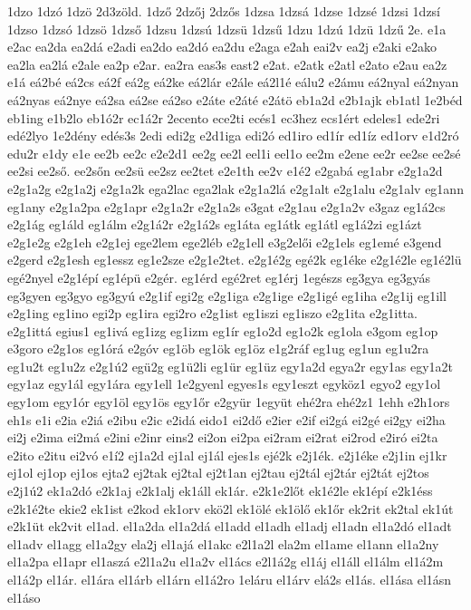 {1dzo
1dzó
1dzö
2d3zöld.
1dző
2dzőj
2dzős
1dzsa
1dzsá
1dzse
1dzsé
1dzsi
1dzsí
1dzso
1dzsó
1dzsö
1dzső
1dzsu
1dzsú
1dzsü
1dzsű
1dzu
1dzú
1dzü
1dzű
2e.
e1a
e2ac
ea2da
ea2dá
e2adi
ea2do
ea2dó
ea2du
e2aga
e2ah
eai2v
ea2j
e2aki
e2ako
ea2la
ea2lá
e2ale
ea2p
e2ar.
ea2ra
eas3s
east2
e2at.
e2atk
e2atl
e2ato
e2au
ea2z
e1á
eá2bé
eá2cs
eá2f
eá2g
eá2ke
eá2lár
e2ále
eá2l1é
eálu2
e2ámu
eá2nyal
eá2nyan
eá2nyas
eá2nye
eá2sa
eá2se
eá2so
e2áte
e2áté
e2átö
eb1a2d
e2b1ajk
eb1atl
1e2béd
eb1ing
e1b2lo
eb1ó2r
ec1á2r
2ecento
ece2ti
ecés1
ec3hez
ecs1ért
edeles1
ede2ri
edé2lyo
1e2dény
edés3s
2edi
edi2g
e2d1iga
edi2ó
ed1iro
ed1ír
ed1íz
ed1orv
e1d2ró
edu2r
e1dy
e1e
ee2b
ee2c
e2e2d1
ee2g
ee2l
eel1i
eel1o
ee2m
e2ene
ee2r
ee2se
ee2sé
ee2si
ee2ső.
ee2sőn
ee2sü
ee2sz
ee2tet
e2e1th
ee2v
e1é2
e2gabá
eg1abr
e2g1a2d
e2g1a2g
e2g1a2j
e2g1a2k
ega2lac
ega2lak
e2g1a2lá
e2g1alt
e2g1alu
e2g1alv
eg1ann
eg1any
e2g1a2pa
e2g1apr
e2g1a2r
e2g1a2s
e3gat
e2g1au
e2g1a2v
e3gaz
eg1á2cs
e2g1ág
eg1áld
eg1álm
e2g1á2r
e2g1á2s
eg1áta
eg1átk
eg1átl
eg1á2zi
eg1ázt
e2g1e2g
e2g1eh
e2g1ej
ege2lem
ege2léb
e2g1ell
e3g2elői
e2g1els
eg1emé
e3gend
e2gerd
e2g1esh
eg1essz
eg1e2sze
e2g1e2tet.
e2g1é2g
egé2k
eg1éke
e2g1é2le
eg1é2lü
egé2nyel
e2g1épí
eg1épü
e2gér.
eg1érd
egé2ret
eg1érj
1egészs
eg3gya
eg3gyás
eg3gyen
eg3gyo
eg3gyú
e2g1if
egi2g
e2g1iga
e2g1ige
e2g1igé
eg1iha
e2g1ij
eg1ill
e2g1ing
eg1ino
egi2p
eg1ira
egi2ro
e2g1ist
eg1iszi
eg1iszo
e2g1ita
e2g1itta.
e2g1ittá
egius1
eg1ivá
eg1izg
eg1izm
eg1ír
eg1o2d
eg1o2k
eg1ola
e3gom
eg1op
e3goro
e2g1os
eg1órá
e2góv
eg1öb
eg1ök
eg1öz
e1g2ráf
eg1ug
eg1un
eg1u2ra
eg1u2t
eg1u2z
e2g1ú2
egü2g
eg1ü2li
eg1ür
eg1üz
egy1a2d
egya2r
egy1as
egy1a2t
egy1az
egy1ál
egy1ára
egy1ell
1e2gyenl
egyes1s
egy1eszt
egyköz1
egyo2
egy1ol
egy1om
egy1ór
egy1öl
egy1ös
egy1őr
e2gyür
1együt
ehé2ra
ehé2z1
1ehh
e2h1ors
eh1s
e1i
e2ia
e2iá
e2ibu
e2ic
e2idá
eido1
ei2dő
e2ier
e2if
ei2gá
ei2gé
ei2gy
ei2ha
ei2j
e2ima
ei2má
e2ini
e2inr
eins2
ei2on
ei2pa
ei2ram
ei2rat
ei2rod
e2iró
ei2ta
e2ito
e2itu
ei2vó
e1í2
ej1a2d
ej1al
ej1ál
ejes1s
ejé2k
e2j1ék.
e2j1éke
e2j1in
ej1kr
ej1ol
ej1op
ej1os
ejta2
ej2tak
ej2tal
ej2t1an
ej2tau
ej2tál
ej2tár
ej2tát
ej2tos
e2j1ú2
ek1a2dó
e2k1aj
e2k1alj
ek1áll
ek1ár.
e2k1e2lőt
ek1é2le
ek1épí
e2k1éss
e2k1é2te
ekie2
ek1ist
e2kod
ek1orv
ekö2l
ek1ölé
ek1ölő
ek1őr
ek2rit
ek2tal
ek1út
e2k1üt
ek2vit
el1ad.
el1a2da
el1a2dá
el1add
el1adh
el1adj
el1adn
el1a2dó
el1adt
el1adv
el1agg
el1a2gy
ela2j
el1ajá
el1akc
e2l1a2l
ela2m
el1ame
el1ann
el1a2ny
el1a2pa
el1apr
el1aszá
e2l1a2u
el1a2v
el1ács
e2l1á2g
el1áj
el1áll
el1álm
el1á2m
el1á2p
el1ár.
el1ára
el1árb
el1árn
el1á2ro
1eláru
el1árv
elá2s
el1ás.
el1ása
el1ásn
el1áso
}
